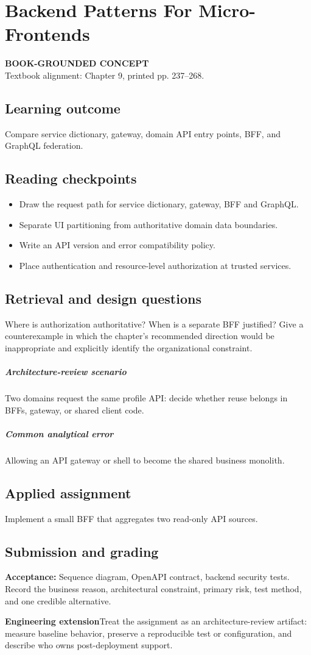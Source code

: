 \documentclass[11pt,letterpaper,oneside]{report}
\newcommand{\based}[1]{\begin{sourcebox}\textbf{BOOK-GROUNDED CONCEPT}\\#1\end{sourcebox}}
\newcommand{\criterion}[1]{\textbf{Acceptance:} #1}
\begin{document}
\chapter{Backend Patterns For Micro-Frontends}
\based{Textbook alignment: Chapter 9, printed pp. 237--268.}
\section{Learning outcome}
Compare service dictionary, gateway, domain API entry points, BFF, and GraphQL federation.
\section{Reading checkpoints}
\begin{itemize}\item Draw the request path for service dictionary, gateway, BFF and GraphQL.
\item Separate UI partitioning from authoritative domain data boundaries.
\item Write an API version and error compatibility policy.
\item Place authentication and resource-level authorization at trusted services.
\end{itemize}
\section{Retrieval and design questions}
Where is authorization authoritative? When is a separate BFF justified? Give a counterexample in which the chapter's recommended direction would be inappropriate and explicitly identify the organizational constraint.
\paragraph{Architecture-review scenario} Two domains request the same profile API: decide whether reuse belongs in BFFs, gateway, or shared client code.
\paragraph{Common analytical error} Allowing an API gateway or shell to become the shared business monolith.
\section{Applied assignment}
Implement a small BFF that aggregates two read-only API sources.
\section{Submission and grading}
\criterion{Sequence diagram, OpenAPI contract, backend security tests. Record the business reason, architectural constraint, primary risk, test method, and one credible alternative.}
\begin{engineerbox}\textbf{Engineering extension}\newline Treat the assignment as an architecture-review artifact: measure baseline behavior, preserve a reproducible test or configuration, and describe who owns post-deployment support.\end{engineerbox}
\end{document}
